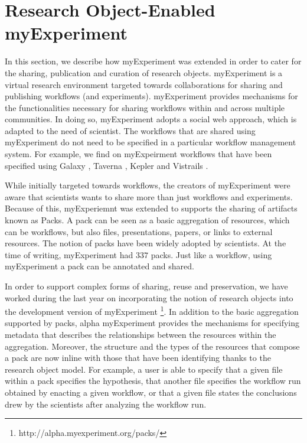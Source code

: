 \section{Research Object-Enabled myExperiment}
\label{sec:myexperiment}


In this section, we describe how myExperiment \cite{} was extended in order to cater for the sharing, publication and curation of research objects. myExperiment is a virtual research environment targeted towards collaborations for sharing and publishing workflows (and experiments). myExperiment provides mechanisms for the functionalities necessary for sharing workflows within and across multiple communities. In doing so, myExperiment adopts a social web approach, which is adapted to the need of scientist. The workflows that are shared using myExperiment do not need to be specified in a particular workflow management system. For example, we find on myExpeirment workflows that have been specified using Galaxy \cite{}, Taverna \cite{}, Kepler \cite{} and Vistrails \cite{}.

While initially targeted towards workflows, the creators of myExperiment were aware that scientists wants to share more than just workflows and experiments. Because of this, myExperiemnt was extended to supports the sharing of artifacts known as Packs. A pack can be seen as a basic aggregation of resources, which can be workflows, but also files, presentations, papers, or links to external resources. 
The notion of packs have been widely adopted by scientists. At the time of writing, myExperiment had $337$ packs. Just like a workflow, using myExperiment a pack can be annotated and shared. 
 
In order to support complex forms of sharing, reuse and preservation, we have worked during the last year on incorporating the notion of research objects into the development version of myExperiment \footnote{http://alpha.myexperiment.org/packs/}. In addition to the basic aggregation supported by packs, alpha myExperiment provides the mechanisms for specifying metadata that describes the relationships between the resources within the aggregation. Moreover, the structure and the types of the resources that compose a pack are now inline with those that have been identifying thanks to the research object model. For example, a user is able to specify that a given file within a pack specifies the hypothesis, that another file specifies the workflow run obtained by enacting a given workflow, or that a given file states the conclusions drew by the scientists after analyzing the workflow run.
